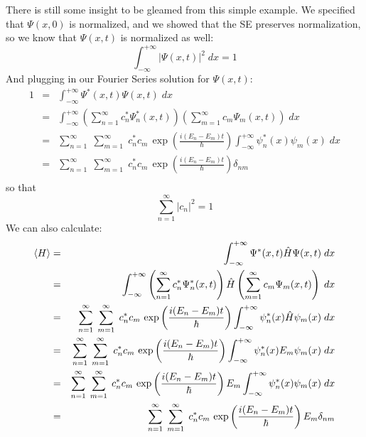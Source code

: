 \documentclass[12pt]{book}
\begin{document}
There is still some insight to be gleamed from this simple example.  We specified that $\Psi(x,0)$ is normalized, and we showed that the SE preserves normalization, so we know that $\Psi(x,t)$ is normalized as well:
\begin{equation*}
\int_{-\infty}^{+\infty} |\Psi(x,t)|^2 \; dx = 1
\end{equation*}
And plugging in our Fourier Series solution for $\Psi(x,t)$:
\begin{eqnarray*}
1 &=& \int_{-\infty}^{+\infty} \Psi^*(x,t)\Psi(x,t) \; dx \\
  &=& \int_{-\infty}^{+\infty} \left( \sum_{n=1}^{\infty} c_n^* \Psi_n^*(x,t) \right) \left( \sum_{m=1}^{\infty} c_m \Psi_m(x,t) \right) \; dx \\
  &=& \sum_{n=1}^{\infty} \; \sum_{m=1}^{\infty} \; c_n^* c_m  \, \exp\left(\frac{i(E_n-E_m)t}{\hbar}\right) \int_{-\infty}^{+\infty} \psi_n^*(x) \psi_m(x) \; dx \\
  &=& \sum_{n=1}^{\infty} \; \sum_{m=1}^{\infty} \; c_n^* c_m  \, \exp\left(\frac{i(E_n-E_m)t}{\hbar}\right) \delta_{nm} \\
\end{eqnarray*}
so that  
\begin{equation}  
\sum_{n=1}^{\infty} |c_n|^2 = 1
\end{equation}
We can also calculate:
\begin{eqnarray*}
\braket{H} &=& \int_{-\infty}^{+\infty} \Psi^*(x,t)\hat{H}\Psi(x,t) \; dx \\
  &=& \int_{-\infty}^{+\infty} \left( \sum_{n=1}^{\infty} c_n^* \Psi_n^*(x,t) \right) \hat{H}\left( \sum_{m=1}^{\infty} c_m \Psi_m(x,t) \right) \; dx \\
  &=& \sum_{n=1}^{\infty} \; \sum_{m=1}^{\infty} \; c_n^* c_m \, \exp\left(\frac{i(E_n-E_m)t}{\hbar}\right) \int_{-\infty}^{+\infty} \psi_n^*(x) \hat{H} \psi_m(x) \; dx \\
  &=& \sum_{n=1}^{\infty} \; \sum_{m=1}^{\infty} \; c_n^* c_m \, \exp\left(\frac{i(E_n-E_m)t}{\hbar}\right) \int_{-\infty}^{+\infty} \psi_n^*(x) E_m \psi_m(x) \; dx \\
  &=& \sum_{n=1}^{\infty} \; \sum_{m=1}^{\infty} \; c_n^* c_m \, \exp\left(\frac{i(E_n-E_m)t}{\hbar}\right) E_m \int_{-\infty}^{+\infty} \psi_n^*(x) \psi_m(x) \; dx \\
  &=& \sum_{n=1}^{\infty} \; \sum_{m=1}^{\infty} \; c_n^* c_m  \, \exp\left(\frac{i(E_n-E_m)t}{\hbar}\right) E_m \delta_{nm} \\
\end{eqnarray*}
\end{document}
